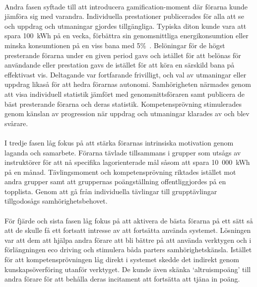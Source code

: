 \paragraph{}
\hspace{-11}Andra fasen syftade till att introducera gamification-moment där förarna kunde jämföra sig med varandra.
Individuella prestationer publicerades för alla att se och uppdrag och utmaningar gjordes tillgängliga.
Typiska diton kunde vara att spara 100~kWh på en vecka, förbättra sin genomsnittliga energikonsumtion eller minska konsumtionen på en viss bana med 5\%~\cite{Cwil2018}.
Belöningar för de högst presterande förarna under en given period gavs och istället för att belönas för användande eller prestation gavs de istället för att köra en särskild bana på effektivast vis.
Deltagande var fortfarande frivilligt, och val av utmaningar eller uppdrag likaså för att hedra förarnas autonomi.
Samhörigheten närmades genom att visa individuell statistik jämfört med genomsnittsföraren samt publicera de bäst presterande förarna och deras statistik.
Kompetensprövning stimulerades genom känslan av progression när uppdrag och utmaningar klarades av och blev svårare.
\paragraph{}
\hspace{-11}I tredje fasen låg fokus på att stärka förarnas intrinsiska motivation genom laganda och samarbete.
Förarna tävlade tillsammans i grupper som utsågs av instruktörer för att nå specifika lagorienterade mål såsom att spara 10~000~kWh på en månad.
Tävlingsmoment och kompetensprövning riktades istället mot andra grupper samt att gruppernas poängställning offentliggjordes på en topplista.
Genom att gå från individuella tävlingar till grupptävlingar tillgodosågs samhörighetsbehovet.
\paragraph{}
\hspace{-11}För fjärde och sista fasen låg fokus på att aktivera de bästa förarna på ett sätt så att de skulle få ett fortsatt intresse av att fortsätta använda systemet.
Lösningen var att dem att hjälpa andra förare att bli bättre på att använda verktygen och i förlängningen eco driving och stimulera båda parters samhörighetskänsla.
Istället för att kompetensprövningen låg direkt i systemet skedde det indirekt genom kunskapsöverföring utanför verktyget.
De kunde även skänka \lq{}altruismpoäng\rq{} till andra förare för att behålla deras incitament att fortsätta att tjäna in poäng.
